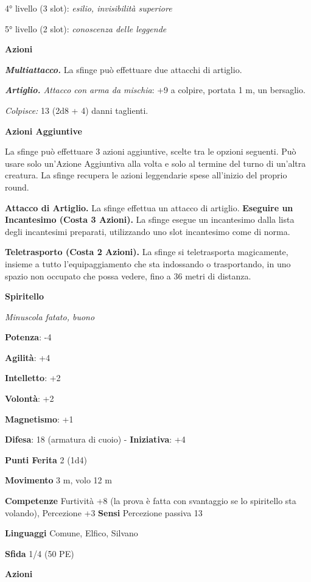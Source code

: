 \begin{multicols}{2}
4° livello (3 slot): \emph{esilio, invisibilità superiore}

5° livello (2 slot): \emph{conoscenza delle leggende}

\smallskip\textbf{Azioni}

\emph{\textbf{Multiattacco.}} La sfinge può effettuare due attacchi di
artiglio.

\emph{\textbf{Artiglio.} Attacco con arma da mischia}: +9 a colpire,
portata 1 m, un bersaglio.

\emph{Colpisce:} 13 (2d8 + 4) danni taglienti.

\textbf{Azioni Aggiuntive}

La sfinge può effettuare 3 azioni aggiuntive, scelte tra le opzioni
seguenti. Può usare solo un'Azione Aggiuntiva alla volta e solo al
termine del turno di un'altra creatura. La sfinge recupera le azioni
leggendarie spese all'inizio del proprio round.

\textbf{Attacco di Artiglio.} La sfinge effettua un attacco di artiglio.
\textbf{Eseguire un Incantesimo (Costa 3 Azioni).} La sfinge esegue un
incantesimo dalla lista degli incantesimi preparati, utilizzando uno
slot incantesimo come di norma.

\textbf{Teletrasporto (Costa 2 Azioni).} La sfinge si teletrasporta
magicamente, insieme a tutto l'equipaggiamento che sta indossando o
trasportando, in uno spazio non occupato che possa vedere, fino a 36
metri di distanza.

\textbf{Spiritello}

\emph{Minuscola fatato, buono}

\textbf{Potenza}: -4

\textbf{Agilità}: +4

\textbf{Intelletto}: +2

\textbf{Volontà}: +2

\textbf{Magnetismo}: +1

\textbf{Difesa}: 18 (armatura di cuoio) - \textbf{Iniziativa}: +4

\textbf{Punti Ferita} 2 (1d4)

\textbf{Movimento} 3 m, volo 12 m

\textbf{Competenze} Furtività +8 (la prova è fatta con svantaggio se lo
spiritello sta volando), Percezione +3 \textbf{Sensi} Percezione passiva
13

\textbf{Linguaggi} Comune, Elfico, Silvano

\textbf{Sfida} 1/4 (50 PE)\smallskip

\smallskip\textbf{Azioni}


\end{multicols}
